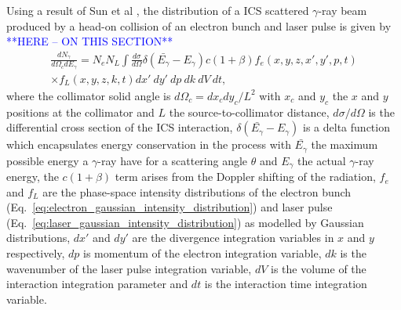 \documentclass[../main.tex]{subfiles}
\begin{document}
Using a result of Sun et al \cite{sun2009characterizations,sun2011theoretical}, the distribution of a ICS scattered $\gamma$-ray beam produced by a head-on collision of an electron bunch and laser pulse is given by \textcolor{blue}{**HERE -- ON THIS SECTION**}
\begin{multline}
\frac{dN_{\gamma}}{d\Omega_{c} dE_{\gamma}} = N_{e}N_{L}\int \frac{d\sigma}{d\Omega}\delta\left(\bar{E_{\gamma}}-E_{\gamma}\right)c\left(1+\beta\right)f_{e}\left(x,y,z,x',y',p,t\right)\\ \times f_L\left(x,y,z,k,t\right)dx'~dy'~dp~dk~dV~dt,
\label{eq:central_distribution_sun}
\end{multline}
where the collimator solid angle is $d\Omega_{c} = dx_{c}dy_{c}/L^{2}$ with $x_{c}$ and $y_{c}$ the $x$ and $y$ positions at the collimator and $L$ the source-to-collimator distance, $d\sigma/d\Omega$ is the differential cross section of the ICS interaction, $\delta\left(\bar{E_{\gamma}}-E_{\gamma}\right)$ is a delta function which encapsulates energy conservation in the process with $\bar{E_{\gamma}}$ the maximum possible energy a $\gamma$-ray have for a scattering angle $\theta$ and $E_{\gamma}$ the actual $\gamma$-ray energy, the $c\left(1+\beta\right)$ term arises from the Doppler shifting of the radiation, $f_{e}$ and $f_{L}$ are the phase-space intensity distributions of the electron bunch (Eq.~\ref{eq:electron_gaussian_intensity_distribution}) and laser pulse (Eq.~\ref{eq:laser_gaussian_intensity_distribution}) as modelled by Gaussian distributions, $dx'$ and $dy'$ are the divergence integration variables in $x$ and $y$ respectively, $dp$ is momentum of the electron integration variable, $dk$ is the wavenumber of the laser pulse integration variable, $dV$ is the volume of the interaction integration parameter and  $dt$ is the interaction time integration variable. 
\end{document}
